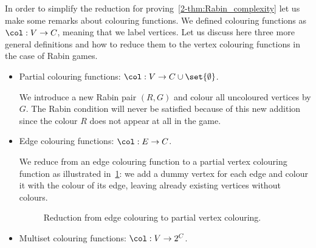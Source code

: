 In order to simplify the reduction for proving~\cref{2-thm:Rabin_complexity} let us make some remarks about colouring functions.
We defined colouring functions as $\col : V \to C$, meaning that we label vertices.
Let us discuss here three more general definitions and how to reduce them to the vertex colouring functions
in the case of Rabin games.
\begin{itemize}
	\item Partial colouring functions: $\col : V \to C \cup \set{\emptyset}$.

We introduce a new Rabin pair $(R,G)$ and colour all uncoloured vertices by $G$.
The Rabin condition will never be satisfied because of this new addition 
since the colour $R$ does not appear at all in the game.

	\item Edge colouring functions: $\col : E \to C$.

We reduce from an edge colouring function to a partial vertex colouring function as illustrated in~\cref{2-fig:reduction_edge_colouring}:
we add a dummy vertex for each edge and colour it with the colour of its edge, leaving already existing vertices without colours. 

\begin{figure}[!ht]
\centering
\caption{Reduction from edge colouring to partial vertex colouring.}
\label{2-fig:reduction_edge_colouring}
\end{figure}
	
	\item Multiset colouring functions: $\col : V \to 2^C$.
	

\end{itemize}
